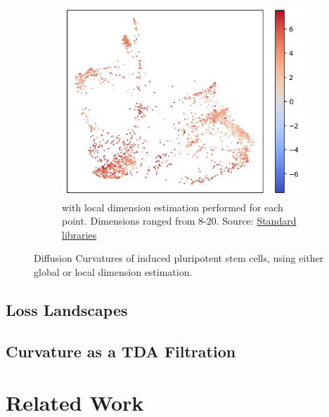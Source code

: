 \documentclass[
  letterpaper,
  DIV=11,
  numbers=noendperiod]{scrartcl}
\theoremstyle{plain}
\theoremstyle{definition}
\theoremstyle{definition}
\theoremstyle{plain}
\theoremstyle{plain}
\theoremstyle{remark}
\begin{document}
\begin{figure}
\begin{minipage}[t]{0.50\linewidth}
{\begin{figure}[H]
{\centering \includegraphics{index_files/figure-latex/fig-single-cell-local-output-1.png}

}

\caption{with local dimension estimation performed for each point.
Dimensions ranged from 8-20. Source:
\href{https://professorwug.github.io/diffusion-curvature//Users/adjourner/Pumberton/Workshop/21-SUMRY-Curvature/diffusion-curvature/nbs/9-single-cell-results.ipynb.html\#cell-fig-single-cell-local}{Standard
libraries}}

\end{figure}

}

\end{minipage}%

\caption{\label{fig-single-cell}Diffusion Curvatures of induced
pluripotent stem cells, using either global or local dimension
estimation.}

\end{figure}

\subsection{Loss Landscapes}\label{loss-landscapes}

\subsection{Curvature as a TDA
Filtration}\label{curvature-as-a-tda-filtration}

\section{Related Work}\label{related-work}
\end{document}
